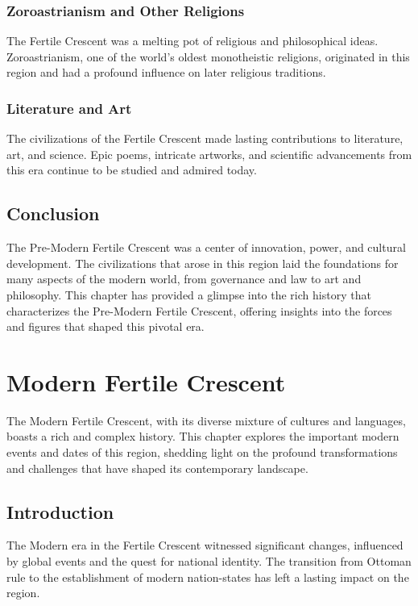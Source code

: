 \documentclass[a4paper,12pt]{book}
\begin{document}
\subsection{Zoroastrianism and Other Religions}
The Fertile Crescent was a melting pot of religious and philosophical ideas. Zoroastrianism, one of the world’s oldest monotheistic religions, originated in this region and had a profound influence on later religious traditions.

\subsection{Literature and Art}
The civilizations of the Fertile Crescent made lasting contributions to literature, art, and science. Epic poems, intricate artworks, and scientific advancements from this era continue to be studied and admired today.

\section{Conclusion}
\label{sec:conclusion-fertile-crescent}

The Pre-Modern Fertile Crescent was a center of innovation, power, and cultural development. The civilizations that arose in this region laid the foundations for many aspects of the modern world, from governance and law to art and philosophy. This chapter has provided a glimpse into the rich history that characterizes the Pre-Modern Fertile Crescent, offering insights into the forces and figures that shaped this pivotal era.

\chapter{Modern Fertile Crescent}
\label{ch:modern-fertile-crescent}

The Modern Fertile Crescent, with its diverse mixture of cultures and languages, boasts a rich and complex history. This chapter explores the important modern events and dates of this region, shedding light on the profound transformations and challenges that have shaped its contemporary landscape.

\section{Introduction}
\label{sec:introduction-modern-fertile-crescent}

The Modern era in the Fertile Crescent witnessed significant changes, influenced by global events and the quest for national identity. The transition from Ottoman rule to the establishment of modern nation-states has left a lasting impact on the region.
\end{document}
